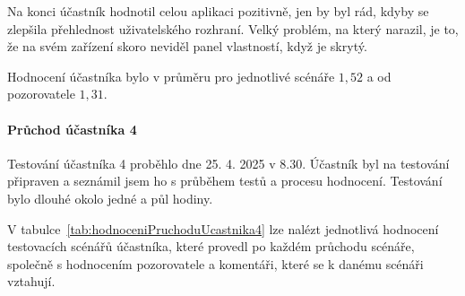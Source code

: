 Na konci účastník hodnotil celou aplikaci pozitivně, jen by byl rád, kdyby se zlepšila přehlednost uživatelského rozhraní.
Velký problém, na který narazil, je to, že na svém zařízení skoro neviděl panel vlastností, když je skrytý. 

Hodnocení účastníka bylo v průměru pro jednotlivé scénáře $1,52$ a od pozorovatele $1,31$.



\paragraph{Průchod účastníka 4}

Testování účastníka 4 proběhlo dne 25. 4. 2025 v 8.30. 
Účastník byl na testování připraven a seznámil jsem ho s průběhem testů a procesu hodnocení. 
Testování bylo dlouhé okolo jedné a půl hodiny.

V tabulce~\ref{tab:hodnoceniPruchoduUcastnika4} lze nalézt jednotlivá hodnocení testovacích scénářů účastníka, které provedl po každém průchodu scénáře, společně s hodnocením pozorovatele a komentáři, které se k danému scénáři vztahují.


